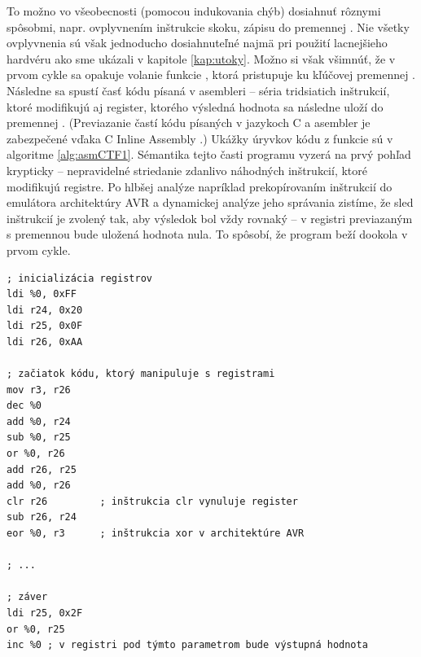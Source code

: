 To možno vo všeobecnosti (pomocou indukovania chýb) dosiahnuť rôznymi spôsobmi, napr. ovplyvnením inštrukcie skoku, zápisu do premennej . Nie všetky ovplyvnenia sú však jednoducho dosiahnuteľné najmä pri použití lacnejšieho hardvéru ako sme ukázali v kapitole \ref{kap:utoky}. Možno si však všimnúť, že v prvom cykle sa opakuje volanie funkcie , ktorá pristupuje ku kľúčovej premennej . Následne sa spustí časť kódu písaná v asembleri -- séria tridsiatich inštrukcií, ktoré modifikujú aj register, ktorého výsledná hodnota sa následne uloží do premennej . (Previazanie častí kódu písaných v jazykoch C a asembler je zabezpečené vďaka C Inline Assembly \cite{inlineAsm}.) Ukážky úryvkov kódu z funkcie  sú v algoritme \ref{alg:asmCTF1}. Sémantika tejto časti programu vyzerá na prvý pohľad krypticky -- nepravidelné striedanie zdanlivo náhodných inštrukcií, ktoré modifikujú registre. Po hlbšej analýze napríklad prekopírovaním inštrukcií do emulátora architektúry AVR a dynamickej analýze jeho správania zistíme, že sled inštrukcií je zvolený tak, aby výsledok bol vždy rovnaký -- v registri previazaným s premennou  bude uložená hodnota nula. To spôsobí, že program beží dookola v prvom cykle.

\begin{lstlisting}[float,language=AVR,caption={Ukážky kritickej časti kódu funkcie \uv{checkStatus} z príkladu 1. \%0 označuje výstupný parameter -- register s výstupnou hodnotou. Tento parameter je previazaný s globálnou premennou status pomocou C Inline Assembly \cite{inlineAsm}.},label=alg:asmCTF1]
; inicializácia registrov
ldi %0, 0xFF
ldi r24, 0x20
ldi r25, 0x0F
ldi r26, 0xAA

; začiatok kódu, ktorý manipuluje s registrami
mov r3, r26
dec %0
add %0, r24
sub %0, r25
or %0, r26
add r26, r25
add %0, r26
clr r26         ; inštrukcia clr vynuluje register
sub r26, r24
eor %0, r3      ; inštrukcia xor v architektúre AVR

; ...

; záver
ldi r25, 0x2F
or %0, r25
inc %0 ; v registri pod týmto parametrom bude výstupná hodnota
\end{lstlisting}

